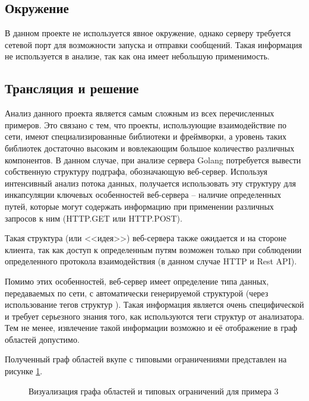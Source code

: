 \subsection{Окружение}

В данном проекте не используется явное окружение, однако серверу требуется сетевой порт для возможности
запуска и отправки сообщений. Такая информация не используется в анализе, так как она имеет небольшую применимость.

\subsection{Трансляция и решение}

Анализ данного проекта является самым сложным из всех перечисленных примеров. Это связано с тем, что
проекты, использующие взаимодействие по сети, имеют специализированные библиотеки и фреймворки, а
уровень таких библиотек достаточно высоким и вовлекающим большое количество различных компонентов.
В данном случае, при анализе сервера Golang потребуется вывести собственную структуру подграфа, обозначающую
веб-сервер. Используя интенсивный анализ потока данных, получается использовать эту структуру
для инкапсуляции ключевых особенностей веб-сервера -- наличие определенных путей, которые
могут содержать информацию при применении различных запросов к ним (HTTP.GET или HTTP.POST).

Такая структура (или <<идея>>) веб-сервера также ожидается и на стороне клиента, так как
доступ к определенным путям возможен только при соблюдении определенного протокола взаимодействия (в данном случае HTTP и Rest API).

Помимо этих особенностей, веб-сервер имеет определение типа данных, передаваемых по сети, с автоматически генерируемой
структурой (через использование тегов структур \cite{struct-tags}). Такая информация является очень специфической и требует
серьезного знания того, как используются теги структур от анализатора. Тем не менее, извлечение такой информации
возможно и её отображение в граф областей допустимо.

Полученный граф областей вкупе с типовыми ограничениями представлен на рисунке \ref{fig:example_3}.
\begin{figure}[H]
    \centering
    \caption{Визуализация графа областей и типовых ограничений для примера 3}
    \label{fig:example_3}
\end{figure}

